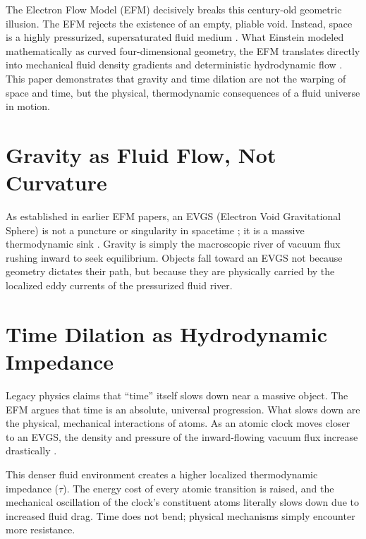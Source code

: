 \documentclass[11pt, a4paper, table]{article}
\begin{document}
  The Electron Flow Model (EFM) decisively breaks this century-old geometric illusion. The EFM rejects the existence of an empty, pliable void. Instead, space is a highly pressurized, supersaturated fluid medium \cite{marabut2026m1}. What Einstein modeled mathematically as curved four-dimensional geometry, the EFM translates directly into mechanical fluid density gradients and deterministic hydrodynamic flow \cite{marabut2026m6}. This paper demonstrates that gravity and time dilation are not the warping of space and time, but the physical, thermodynamic consequences of a fluid universe in motion.

\clearpage
\section{Gravity as Fluid Flow, Not Curvature}
  As established in earlier EFM papers, an EVGS (Electron Void Gravitational Sphere) is not a puncture or singularity in spacetime \cite{marabut2026m10}; it is a massive thermodynamic sink \cite{marabut2026m8}. Gravity is simply the macroscopic river of vacuum flux rushing inward to seek equilibrium. Objects fall toward an EVGS not because geometry dictates their path, but because they are physically carried by the localized eddy currents of the pressurized fluid river. 

\section{Time Dilation as Hydrodynamic Impedance}
  Legacy physics claims that ``time'' itself slows down near a massive object. The EFM argues that time is an absolute, universal progression. What slows down are the physical, mechanical interactions of atoms. As an atomic clock moves closer to an EVGS, the density and pressure of the inward-flowing vacuum flux increase drastically \cite{marabut2026m4}. 
  
  This denser fluid environment creates a higher localized thermodynamic impedance ($\tau$). The energy cost of every atomic transition is raised, and the mechanical oscillation of the clock's constituent atoms literally slows down due to increased fluid drag. Time does not bend; physical mechanisms simply encounter more resistance. 
  
\end{document}
